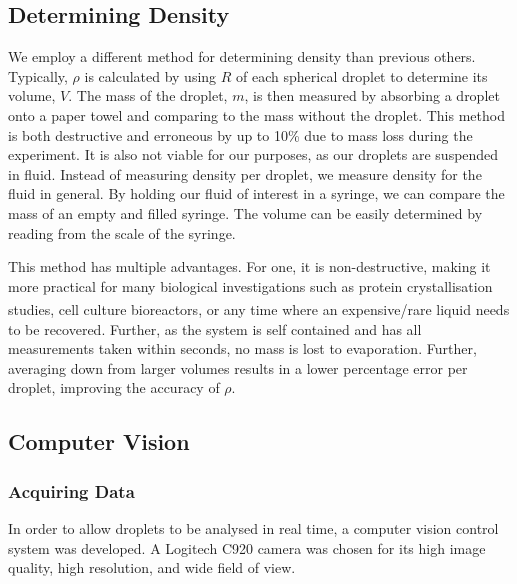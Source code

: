 \documentclass{physics_article_B}
\begin{document}
        
    \subsection{Determining Density\label{sect:method:density}}
    
        We employ a different method for determining density than previous others. Typically, $\rho$ is calculated by using $R$ of each spherical droplet to determine its volume, $V$. The mass of the droplet, $m$, is then measured by absorbing a droplet onto a paper towel and comparing to the mass without the droplet\cite{hill}. This method is both destructive and erroneous by up to 10\%\cite{harrold2} due to mass loss during the experiment. It is also not viable for our purposes, as our droplets are suspended in fluid. 
        Instead of measuring density per droplet, we measure density for the fluid in general. By holding our fluid of interest in a syringe, we can compare the mass of an empty and filled syringe. The volume can be easily determined by reading from the scale of the syringe.
    
        This method has multiple advantages. For one, it is non-destructive, making it more practical for many biological investigations such as protein crystallisation studies\textsuperscript{\cite{zhu}}, cell culture bioreactors\textsuperscript{\cite{konry}}, or any time where an expensive/rare liquid needs to be recovered\cite{Backholm2017}. Further, as the system is self contained and has all measurements taken within seconds, no mass is lost to evaporation. Further, averaging down from larger volumes results in a lower percentage error per droplet, improving the accuracy of $\rho$.
        
    \subsection{Computer Vision\label{sect:method:vision}}
        
        \subsubsection{Acquiring Data\label{sect:method:vision:acquire}}
        
            In order to allow droplets to be analysed in real time, a computer vision control system was developed. A Logitech C920 camera was chosen for its high image quality, high resolution, and wide field of view. 
            
\end{document}
